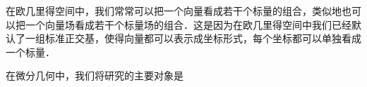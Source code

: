 
\begin{issues}
\issueTODO
\end{issues}



在欧几里得空间中，我们常常可以把一个向量看成若干个标量的组合，类似地也可以把一个向量场看成若干个标量场的组合．这是因为在欧几里得空间中我们已经默认了一组标准正交基，使得向量都可以表示成坐标形式，每个坐标都可以单独看成一个标量．

在微分几何中，我们将研究的主要对象是



